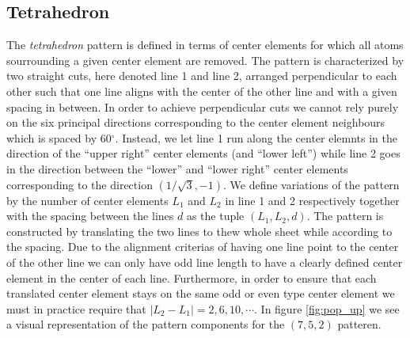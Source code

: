 \subsection{Tetrahedron}
The \textit{tetrahedron} pattern is defined in terms of center elements for which all
atoms sourrounding a given center element are removed. The pattern is
characterized by two straight cuts, here denoted line 1 and line 2, arranged
perpendicular to each other such that one line aligns with the center of the
other line and with a given spacing in between. In order to achieve
perpendicular cuts we cannot rely purely on the six principal directions
corresponding to the center element neighbours which is spaced by 60$^\circ$.
Instead, we let line 1 run along the center elemnts in the direction of the
``upper right'' center elements (and ``lower left'') while line 2 goes in the
direction between the ``lower'' and ``lower right'' center elements
corresponding to the direction $(1/\sqrt{3}, -1)$. We define variations of the
pattern by the number of center elements $L_1$ and $L_2$ in line 1 and 2
respectively together with the spacing between the lines $d$ as the tuple $(L_1,
L_2, d)$. The pattern is constructed by translating the two lines to thew whole sheet while according to the spacing. Due to the alignment criterias of having one line point to the center of the other line we can only have odd line length to have a clearly defined center element in the center of each line. Furthermore, in order to ensure that each translated center element stays on the same odd or even type center element we must in practice require that $|L_2 - L_1| = 2, 6, 10, \cdots$. In figure \ref{fig:pop_up} we see a visual representation of the pattern components for the $(7, 5, 2)$ patteren. 


